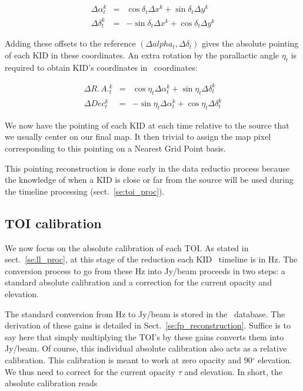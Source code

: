 \begin{eqnarray}
\Delta\alpha^k_t &=&  \cos\delta_t \Delta x^k + \sin\delta_t \Delta y^k \nonumber\\
\Delta\delta^k_t &=& -\sin\delta_t \Delta x^k + \cos\delta_t \Delta y^k \nonumber
\end{eqnarray}

Adding these offsets to the reference $(\Delta alpha_t, \Delta \delta_t)$ gives the absolute
pointing of each KID in these coordinates. An extra rotation by the parallactic
angle $\eta_t$ is required to obtain KID's coordinates in \radec\ coordinates:

\begin{eqnarray}
\Delta R.\,A.^k_t &=&  \cos\eta_t \Delta\alpha^k_t + \sin\eta_t \Delta\delta^k_t\\
\Delta Dec^k_t    &=& -\sin\eta_t \Delta\alpha^k_t + \cos\eta_t \Delta\delta^k_t
\end{eqnarray}

We now have the pointing of each KID at each time relative to the source that we
usually center on our final map. It then trivial to assign the map pixel
corresponding to this pointing on a Nearest Grid Point basis.

This pointing reconstruction is done early in the data reductio process because
the knowledge of when a KID is close or far from the source will be used during
the timeline processing (sect.~\ref{se:toi_proc}).

\subsection{TOI calibration}
\label{se:flux_calib}

We now focus on the absolute calibration of each TOI. As stated in
sect.~\ref{se:ll_proc}, at this stage of the reduction each KID \rf~timeline is
in Hz. The conversion process to go from these Hz into Jy/beam proceeds in two
steps: a standard absolute calibration and a correction for the current opacity
and elevation.

The standard conversion from Hz to Jy/beam is stored in the
\kidpar\ database. The derivation of these gains is detailed in
Sect.~\ref{se:fp_reconstruction}. Suffice is to say here that simply multiplying
the TOI's by these gains converts them into Jy/beam. Of course, this individual
absolute calibration also acts as a relative calibration. This calibration is
meant to work at zero opacity and 90$^\circ$ elevation. We thus need to correct
for the current opacity $\tau$ and elevation. In short, the absolute calibration reads

